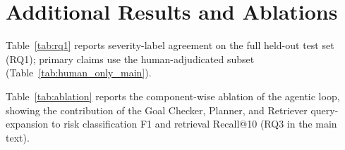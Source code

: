 \section{Additional Results and Ablations}
\label{app:retriever}

\begin{table}[h]
\centering
\caption{Severity-label agreement on the full held-out test set, including retained pre-labels (RQ1; point estimates, reported for scale). B5 is matched to VIGIL's mean iteration budget (not to total LLM calls or tokens).}
\label{tab:rq1}
\small
{}
\end{table}


Table~\ref{tab:rq1} reports severity-label agreement on the full held-out test set (RQ1); primary claims use the human-adjudicated subset (Table~\ref{tab:human_only_main}).

Table~\ref{tab:ablation} reports the component-wise ablation of the agentic loop, showing the contribution of the Goal Checker, Planner, and Retriever query-expansion to risk classification F1 and retrieval Recall@10 (RQ3 in the main text).

\begin{table}[h]
\centering
\caption{Agentic-loop ablation: component-wise contribution to risk classification F1 and retrieval Recall@10 (mean over 5 evaluation runs). Referenced from the main text (RQ3).}
\label{tab:ablation}
\small
\setlength{\tabcolsep}{4pt}
\end{table}

